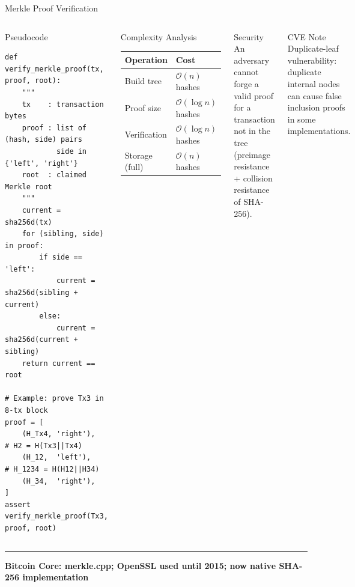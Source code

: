 \documentclass[8pt,aspectratio=169]{beamer}
\newcommand{\bottomnote}[1]{\vfill\vspace{-2mm}\textcolor{mllavender2}{\rule{\textwidth}{0.4pt}}\vspace{1mm}\footnotesize\textbf{#1}}
\begin{document}
\begin{frame}[fragile]{Merkle Proof Verification}
\begin{columns}
\begin{block}{Pseudocode}
\begin{lstlisting}
def verify_merkle_proof(tx, proof, root):
    """
    tx    : transaction bytes
    proof : list of (hash, side) pairs
            side in {'left', 'right'}
    root  : claimed Merkle root
    """
    current = sha256d(tx)
    for (sibling, side) in proof:
        if side == 'left':
            current = sha256d(sibling + current)
        else:
            current = sha256d(current + sibling)
    return current == root

# Example: prove Tx3 in 8-tx block
proof = [
    (H_Tx4, 'right'),   # H2 = H(Tx3||Tx4)
    (H_12,  'left'),    # H_1234 = H(H12||H34)
    (H_34,  'right'),
]
assert verify_merkle_proof(Tx3, proof, root)
\end{lstlisting}
\end{block}
\begin{block}{Complexity Analysis}
\begin{tabular}{ll}
\toprule
Operation & Cost\\
\midrule
Build tree & $\mathcal{O}(n)$ hashes\\
Proof size & $\mathcal{O}(\log n)$ hashes\\
Verification & $\mathcal{O}(\log n)$ hashes\\
Storage (full) & $\mathcal{O}(n)$ hashes\\
\bottomrule
\end{tabular}
\end{block}
\vspace{2mm}
\begin{block}{Security}\small
An adversary cannot forge a valid proof for a transaction not in the tree (preimage resistance + collision resistance of SHA-256).
\end{block}
\vspace{2mm}
\begin{alertblock}{CVE Note}\small
Duplicate-leaf vulnerability: duplicate internal nodes can cause false inclusion proofs in some implementations.
\end{alertblock}
\end{columns}
\bottomnote{Bitcoin Core: merkle.cpp; OpenSSL used until 2015; now native SHA-256 implementation}
\end{frame}
\end{document}
